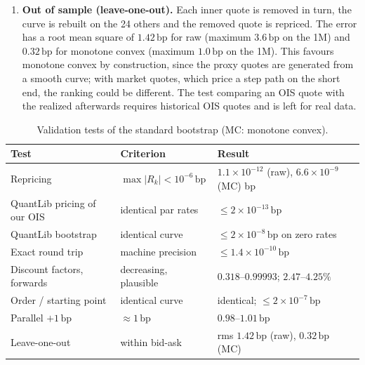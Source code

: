 \documentclass[11pt,a4paper]{article}
\theoremstyle{plain}
\theoremstyle{definition}
\newcommand{\bp}{\,\mathrm{bp}}
\newcommand{\estr}{\text{\texteuro STR}}
\begin{document}
\begin{enumerate}[label=(\arabic*)]
\begin{itemize}
        \item A parallel $+1\bp$ shift of all quotes moves the zero curve by between $0.98$ and $1.01\bp$: par rates and zero rates do not move one for one.
        \item The sum of the par-point sensitivities equals the parallel sensitivity for raw, but not for monotone convex, which is not linear in its inputs (Section~\ref{sec:risk}).
    \end{itemize}
    \item \textbf{Out of sample (leave-one-out).} Each inner quote is removed in turn, the curve is rebuilt on the 24 others and the removed quote is repriced. The error has a root mean square of $1.42\bp$ for raw (maximum $3.6\bp$ on the 1M) and $0.32\bp$ for monotone convex (maximum $1.0\bp$ on the 1M). This favours monotone convex by construction, since the proxy quotes are generated from a smooth curve; with market quotes, which price a step path on the short end, the ranking could be different. The test comparing an OIS quote with the \estr{} realized afterwards requires historical OIS quotes and is left for real data.
\end{enumerate}

\begin{table}[htbp]
\centering
\footnotesize
\begin{tabular}{@{}lll@{}}
\toprule
Test & Criterion & Result \\
\midrule
Repricing & $\max|R_k|<10^{-6}\bp$ & $1.1\times10^{-12}$ (raw), $6.6\times10^{-9}$ (MC) bp \\
QuantLib pricing of our OIS & identical par rates & $\le2\times10^{-13}\bp$ \\
QuantLib bootstrap & identical curve & $\le2\times10^{-8}\bp$ on zero rates \\
Exact round trip & machine precision & $\le1.4\times10^{-10}\bp$ \\
Discount factors, forwards & decreasing, plausible & $0.318$--$0.99993$; $2.47$--$4.25\%$ \\
Order / starting point & identical curve & identical; $\le2\times10^{-7}\bp$ \\
Parallel $+1\bp$ & $\approx1\bp$ & $0.98$--$1.01\bp$ \\
Leave-one-out & within bid-ask & rms $1.42\bp$ (raw), $0.32\bp$ (MC) \\
\bottomrule
\end{tabular}
\caption{Validation tests of the standard \estr{} bootstrap (MC: monotone convex).}
\label{tab:validation}
\end{table}
\end{document}
